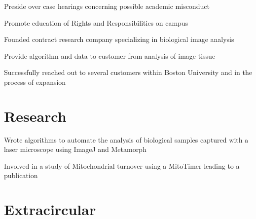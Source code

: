 \documentclass[]{deedy-resume-openfont}
\begin{document}
\begin{minipage}[t]{0.66\textwidth}
\begin{tightemize}
\item Preside over case hearings concerning possible academic misconduct
\item Promote education of Rights and Responsibilities on campus
\end{tightemize}
\sectionsep

\begin{tightemize}
\item Founded contract research company specializing in biological image analysis
\item  Provide algorithm and data to customer from analysis of image tissue
\item Successfully reached out to several customers within Boston University and in the process of expansion
\end{tightemize}
\sectionsep



\section{Research}
\begin{tightemize}
\item Wrote algorithms to automate the analysis of biological samples captured with a laser microscope using ImageJ and Metamorph
\item Involved in a study of Mitochondrial turnover using a MitoTimer leading to a publication
\end{tightemize}
\sectionsep

\section{Extracircular}
\sectionsep

\end{minipage} 
\end{document}
